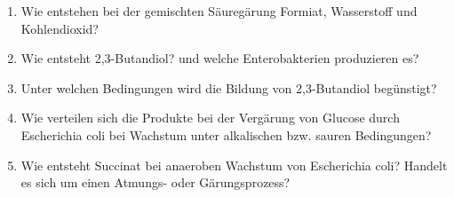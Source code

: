 \begin{enumerate}
	\item Wie entstehen bei der gemischten Säuregärung Formiat, Wasserstoff und Kohlendioxid?
	\item Wie entsteht 2,3-Butandiol? und welche Enterobakterien produzieren es?
	\item Unter welchen Bedingungen wird die Bildung von 2,3-Butandiol begünstigt?
	\item Wie verteilen sich die Produkte bei der Vergärung von Glucose durch Escherichia coli bei Wachstum unter alkalischen bzw. sauren Bedingungen?
	\item Wie entsteht Succinat bei anaeroben Wachstum von Escherichia coli? Handelt es sich um einen Atmungs- oder Gärungsprozess?
\end{enumerate}
